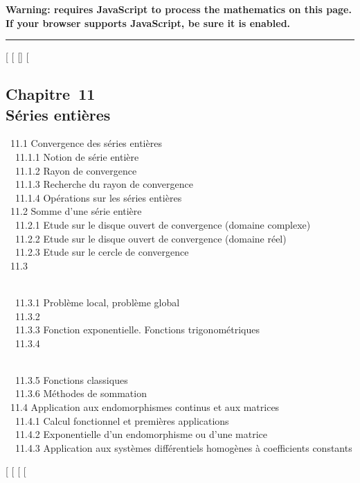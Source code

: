 \textbf{Warning: 
requires JavaScript to process the mathematics on this page.\\ If your
browser supports JavaScript, be sure it is enabled.}

\begin{center}\rule{3in}{0.4pt}\end{center}

{[}
{[}
{[}{]}
{[}

\subsection{Chapitre~11\\Séries entières}

~11.1 {Convergence des séries
entières} \\ ~~11.1.1 {Notion de
série entière} \\ ~~11.1.2 {Rayon
de convergence} \\ ~~11.1.3
{Recherche du rayon de
convergence} \\ ~~11.1.4
{Opérations sur les séries
entières} \\ ~11.2 {Somme d'une
série entière} \\ ~~11.2.1 {Etude
sur le disque ouvert de convergence (domaine complexe)} \\ ~~11.2.2
{Etude sur le disque ouvert de
convergence (domaine réel)} \\ ~~11.2.3
{Etude sur le cercle de
convergence} \\ ~11.3

\\ ~~11.3.1 {Problème local,
problème global} \\ ~~11.3.2
 \\
~~11.3.3 {Fonction exponentielle.
Fonctions trigonométriques} \\ ~~11.3.4

\\ ~~11.3.5 {Fonctions
classiques} \\ ~~11.3.6 {Méthodes
de sommation} \\ ~11.4 {Application
aux endomorphismes continus et aux matrices} \\ ~~11.4.1
{Calcul fonctionnel et premières
applications} \\ ~~11.4.2
{Exponentielle d'un endomorphisme
ou d'une matrice} \\ ~~11.4.3
{Application aux systèmes
différentiels homogènes à coefficients constants}

{[}
{[}
{[}
{[}

